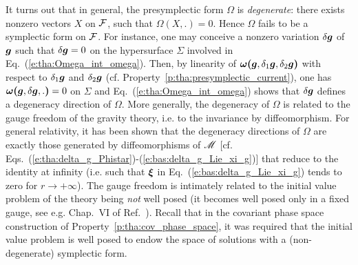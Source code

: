 It turns out that in general, the presymplectic form $\Omega$
is \emph{degenerate}:
there exists nonzero vectors $X$ on $\mathcal{F}$, such that $\Omega(X,.) = 0$.
Hence $\Omega$ fails to be a symplectic form on $\mathcal{F}$.
For instance, one may conceive a nonzero variation $\delta\bm{g}$
of $\bm{g}$ such that $\delta\bm{g} = 0$ on the hypersurface $\Sigma$ involved
in Eq.~(\ref{e:tha:Omega_int_omega}). Then, by linearity of
$\bm{\omega}\textbf{(}\bm{g},\delta_1\bm{g},\delta_2\bm{g}\textbf{)}$ with respect to
$\delta_1\bm{g}$ and $\delta_2\bm{g}$ (cf. Property~\ref{p:tha:presymplectic_current}), one has
$\bm{\omega}\textbf{(}\bm{g},\delta\bm{g},.\textbf{)} = 0$ on $\Sigma$
and Eq.~(\ref{e:tha:Omega_int_omega}) shows that $\delta\bm{g}$ defines
a degeneracy direction of $\Omega$. More generally, the degeneracy of $\Omega$
is related to the gauge freedom of the gravity theory, i.e. to the
invariance by diffeomorphism. For general relativity, it has been shown
\cite{AshteBR91} that the degeneracy directions of $\Omega$ are exactly
those generated by diffeomorphisms of $\mathscr{M}$ [cf.
Eqs.~(\ref{e:tha:delta_g_Phistar})-(\ref{e:bas:delta_g_Lie_xi_g})] that reduce to the identity at infinity
(i.e. such that $\bm{\xi}$ in Eq.~(\ref{e:bas:delta_g_Lie_xi_g}) tends to
zero for $r\to +\infty$). The gauge freedom is intimately related to the
initial value problem of the theory being \emph{not} well posed (it becomes
well posed only in a fixed gauge, see e.g. Chap.~VI of Ref.~\cite{Choqu09}). Recall that in the covariant phase space
construction of Property~\ref{p:tha:cov_phase_space}, it was required
that the initial value problem is well posed to endow the space of solutions
with a (non-degenerate) symplectic form.

